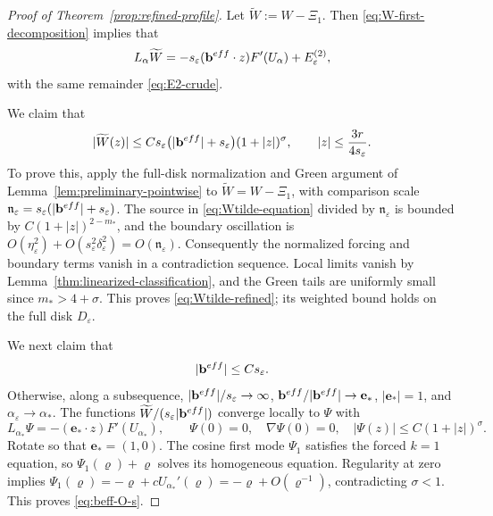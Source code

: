 \documentclass[10pt,a4paper]{amsart}
\numberwithin{equation}{section}
\theoremstyle{definition}
\theoremstyle{remark}
\newcommand{\eps}{\varepsilon}
\newcommand{\etae}{\eta_{\eps}}
\newcommand{\de}{\delta_{\eps}}
\begin{document}
\begin{proof}[Proof of Theorem~\ref{prop:refined-profile}]
Let \(\widetilde W:=W-\Xi_1\).
Then \eqref{eq:W-first-decomposition} implies that
{ 
\begin{equation}
  L_\alpha\widetilde W
  =
  -s_\eps(\mathbf{b}^{\rm eff}\cdot z)F'(U_\alpha)
  + E_\eps^{(2)},
  \label{eq:Wtilde-equation}
\end{equation}
}
with the same remainder \eqref{eq:E2-crude}.

\medskip
{}
We claim that
\begin{equation}
  |\widetilde W(z)|
  \le
  Cs_\eps\bigl(|\mathbf{b}^{\rm eff}|+s_\eps\bigr)(1+|z|)^\sigma, 
  \qquad
  |z|\le\frac{3r}{4s_\eps}.
  \label{eq:Wtilde-refined}
\end{equation}
To prove this, apply the full-disk normalization and Green argument
of Lemma~\ref{lem:preliminary-pointwise} to
$\widetilde W=W-\Xi_1$, with comparison scale
$\mathfrak n_\eps=s_\eps(|\mathbf{b}^{\rm eff}|+s_\eps)$. The source in
\eqref{eq:Wtilde-equation} divided by $\mathfrak n_\eps$ is bounded by
$C(1+|z|)^{2-m_*}$, and the boundary oscillation is
$O(\etae^2)+O(s_\eps^2\de^2)=O(\mathfrak n_\eps)$.
Consequently the normalized forcing and boundary terms vanish in a
contradiction sequence. Local limits vanish by
Lemma~\ref{thm:linearized-classification}, and the Green tails are
uniformly small since $m_*>4+\sigma$. This proves
\eqref{eq:Wtilde-refined}; its weighted bound holds on the full disk
$D_\eps$.

We next claim that
\begin{equation}
  |\mathbf{b}^{\rm eff}|\le Cs_\eps.
  \label{eq:beff-O-s}
\end{equation}
Otherwise, along a subsequence,
$|\mathbf{b}^{\rm eff}|/s_\eps\to\infty$,
$\mathbf{b}^{\rm eff}/|\mathbf{b}^{\rm eff}|\to\mathbf e_*$, $|\mathbf e_*|=1$, and
$\alpha_\eps\to\alpha_*$. The functions
$\widetilde W/(s_\eps|\mathbf{b}^{\rm eff}|)$ converge locally to $\Psi$ with
\begin{equation}\label{eq:Psi-effective-limit}
 L_{\alpha_*}\Psi=-(\mathbf e_*\cdot z)F'(U_{\alpha_*}),\qquad
 \Psi(0)=0,\quad\nabla\Psi(0)=0,\quad
 |\Psi(z)|\le C(1+|z|)^\sigma.
\end{equation}
Rotate so that $\mathbf e_*=(1,0)$. The cosine first mode $\Psi_1$ satisfies
the forced $k=1$ equation, so $\Psi_1(\varrho)+\varrho$ solves its homogeneous
equation. Regularity at zero implies
$\Psi_1(\varrho)=-\varrho+cU_{\alpha_*}'(\varrho)=-\varrho+O(\varrho^{-1})$, contradicting
$\sigma<1$. This proves \eqref{eq:beff-O-s}.


\end{proof}
\end{document}
